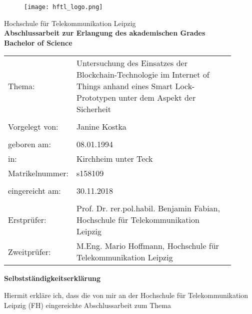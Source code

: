 \documentclass[toc=sectionentrywithdots,a4paper,12pt,oneside]{scrartcl}
\newcommand{\grad}{Bachelor of Science}
\newcommand{\matrinr}{s158109}
\newcommand{\thema}{Untersuchung des Einsatzes der Blockchain-Technologie im Internet of Things anhand eines Smart Lock-Prototypen unter dem Aspekt der Sicherheit}
\newcommand{\name}{Janine Kostka}
\newcommand{\geb}{08.01.1994}
\newcommand{\ort}{Kirchheim unter Teck}
\newcommand{\erstp}{Prof. Dr. rer.pol.habil. Benjamin Fabian}
\newcommand{\instituterst}{Hochschule für Telekommunikation Leipzig}
\newcommand{\zweitp}{M.Eng. Mario Hoffmann}
\newcommand{\institutzweit}{Hochschule für Telekommunikation Leipzig}
\newcommand{\abgabe}{30.11.2018}
\begin{document}
	\begin{titlepage}
    \begin{spacing}{1.0}
		\begin{figure}[h]
			\texttt{[image: hftl\_logo.png]}
		\end{figure}
		\vspace*{20pt}
		\centering
		Hochschule für Telekommunikation Leipzig\\
		\vspace*{40pt}
		\large \textbf{Abschlussarbeit zur Erlangung des akademischen Grades}\\
		\doublespacing
		\textbf{\grad} %
		\vspace*{100pt}
		\begin{table}[h!]
			\begin{tabular}{p{0.2\linewidth}p{0.7\linewidth}}
				Thema: & \large \thema \\
				\\[5em]
				Vorgelegt von: & \large \name  \\
				\\[2em]
				geboren am: & \geb \\
				in: & \ort \\
				Matrikelnummer: & \matrinr \\
			 	\\[2em]
			 	eingereicht am: & \abgabe \\
			 	\\[2em]
			 	Erstprüfer: & \erstp, \instituterst \\
			 	Zweitprüfer: & \zweitp, \institutzweit \\
			\end{tabular}
		\end{table}
	\normalsize
	\end{spacing}
	\end{titlepage}
	\newpage
	\thispagestyle{empty}
	\vspace*{3em}
	\begin{center}
		\LARGE \textbf{Selbstständigkeitserklärung}
	\end{center}
	\normalsize
	\vspace*{3em}
	Hiermit erkläre ich, dass die von mir an der Hochschule für Telekommunikation Leipzig (FH)
	eingereichte Abschlussarbeit zum Thema
\end{document}
